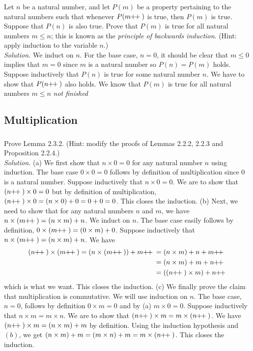 \documentclass{amsart}
\theoremstyle{definition}
\newcommand{\soln}{\newline\textit{Solution.} }
\newcommand{\pls}{\mathop{\hspace{-2pt}+\hspace{-3.5pt}+{}}}
\begin{document}
\subsubsection{} Let $n$ be a natural number, and let $P(m)$ be a property pertaining to the natural numbers such that whenever $P(m\pls)$ is true, then $P(m)$ is true. Suppose that $P(n)$ is also true. Prove that $P(m)$ is true for all natural numbers $m\leq n$; this is known as the \textit{principle of backwards induction}. (Hint: apply induction to the variable $n$.) \\
\soln We induct on $n$. For the base case, $n=0$, it should be clear that $m\leq 0$ implies that $m=0$ since $m$ is a natural number so $P(n)=P(m)$ holds. Suppose inductively that $P(n)$ is true for some natural number $n$. We have to show that $P(n\pls)$ also holds. We know that $P(m)$ is true for all natural numbers $m\leq n$ \textit{not finished}


\subsection{Multiplication}

\subsubsection{} Prove Lemma 2.3.2. (Hint: modify the proofs of Lemmas 2.2.2, 2.2.3 and Proposition 2.2.4.) \\
\soln (a) We first show that $n\times 0=0$ for any natural number $n$ using induction. The base case $0\times 0=0$ follows by definition of multiplication since $0$ is a natural number. Suppose inductively that $n\times0=0$. We are to show that $(n\pls)\times0=0$ but by definition of multiplication, $(n\pls)\times0=(n\times0)+0=0+0=0$. This closes the induction. (b) Next, we need to show that for any natural numbers $n$ and $m$, we have $n\times(m\pls)=(n\times m)+n$. We induct on $n$. The base case easily follows by definition, $0\times (m\pls)=(0\times m)+0$. Suppose inductively that $n\times (m\pls)=(n\times m)+n$. We have 
\begin{align*}
(n\pls)\times (m\pls) = (n\times (m\pls))+m\pls &=(n\times m)+n+m\pls \\
&=(n\times m)+m+n\pls \\
&=((n\pls)\times m)+n\pls
\end{align*}
which is what we want. This closes the induction. (c) We finally prove the claim that multiplication is commutative. We will use induction on $n$. The base case, $n=0$, follows by definition $0\times m=0$ and by (a) $m\times 0=0$. Suppose inductively that $n\times m=m\times n$. We are to show that $(n\pls)\times m=m\times (n\pls)$. We have $(n\pls)\times m=(n\times m)+m$ by definition. Using the induction hypothesis and $(b)$, we get $(n\times m)+m=(m\times n)+m=m\times (n\pls)$. This closes the induction. \\
\end{document}
